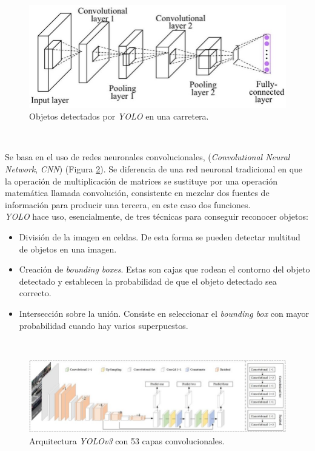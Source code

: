 \begin{figure} [h!]
	\begin{center}
		\includegraphics[width=12cm]{figs/yolo}
	\end{center}
	\caption{Objetos detectados por \textit{YOLO} en una carretera.}
	\label{fig:yolo}
\end{figure}\

Se basa en el uso de redes neuronales convolucionales, (\textit{Convolutional Neural Network}, \textit{CNN}) (Figura \ref{fig:yololayers}). Se diferencia de una red neuronal tradicional en que la operación de multiplicación de matrices se sustituye por una operación matemática llamada convolución, consistente en mezclar dos fuentes de información para producir una tercera, en este caso dos funciones.\\

\textit{YOLO} hace uso, esencialmente, de tres técnicas para conseguir reconocer objetos:
\begin{itemize}
	\item División de la imagen en celdas. De esta forma se pueden detectar multitud de objetos en una imagen.
	\item Creación de \textit{bounding boxes}. Estas son cajas que rodean el contorno del objeto detectado y establecen la probabilidad de que el objeto detectado sea correcto.
	\item Intersección sobre la unión. Consiste en seleccionar el \textit{bounding box} con mayor probabilidad cuando hay varios superpuestos.
\end{itemize}\

\begin{figure} [h!]
	\begin{center}
		\includegraphics[width=16cm]{figs/yolov353}
	\end{center}
	\caption{Arquitectura \textit{YOLOv3} con 53 capas convolucionales.}
	\label{fig:yololayers}
\end{figure}\

